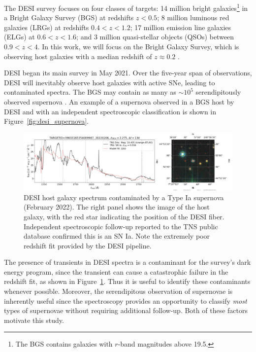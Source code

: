 The DESI survey focuses on four classes of targets: 14 million bright galaxies\footnote{The BGS contains galaxies with $r$-band magnitudes above 19.5.} in a Bright Galaxy Survey (BGS) at redshifts $z<0.5$; 8 million luminous red galaxies (LRGs) at redshifts $0.4<z<1.2$; 17 million emission line galaxies (ELGs) at $0.6<z<1.6$; and 3 million quasi-stellar objects (QSOs) between $0.9<z<4$. In this work, we will focus on the Bright Galaxy Survey, which is observing host galaxies with a median redshift of $z\approx0.2$ \parencite{desicollaboration2016, hahn2022}.

DESI began its main survey in May 2021. Over the five-year span of observations, DESI will inevitably observe host galaxies with active SNe, leading to 
contaminated spectra. The BGS may contain as many as $\sim10^5$ serendipitously observed supernova 
\parencite{desicollaboration2016}. An example of a supernova observed in a BGS host by DESI and with an independent spectroscopic classification is shown in 
Figure~\ref{fig:desi_supernova}.
\begin{figure}[t!]
    \centering
    \includegraphics[width=\textwidth]{figures/desi_figures/SNe_detection_desifail.png}
    \caption[SNe Influencing DESI Redshift Fit]{DESI host galaxy spectrum contaminated by a Type Ia supernova (February 2022). The right panel shows the image of the host galaxy, with the red star indicating the position of the DESI fiber. Independent spectroscopic follow-up reported to the TNS public database confirmed this is an SN Ia. Note the extremely poor redshift fit provided by the DESI pipeline.}
    \label{fig:desi_supernova_fail}
\end{figure}

%
%
%
The presence of transients in DESI spectra is a contaminant for the survey's dark energy program, since the transient can cause a catastrophic failure in the redshift fit, as shown in Figure~\ref{fig:desi_supernova_fail}. Thus it is useful to identify these contaminants whenever possible. Moreover, the serendipitous observation of supernovae is inherently useful since the spectroscopy provides an opportunity to classify {\sl most} types of supernovae without requiring additional follow-up. Both of these factors motivate this study.


